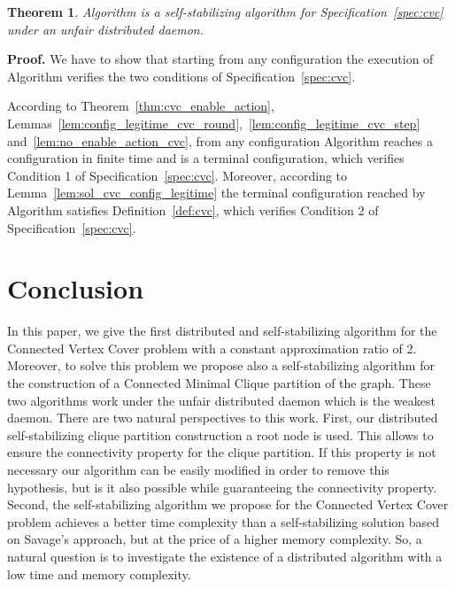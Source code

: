 \documentclass[11pt,letterpaper,onecolumn]{article}
\newtheorem{theorem}{Theorem}
\newenvironment{proof}{\noindent \begin{rm}{\textbf{Proof.} }}{\hspace*{\fill}\par\end{rm} \vspace{.3cm}}
\begin{document}
\begin{theorem}
Algorithm  is a self-stabilizing algorithm for Specification~\ref{spec:cvc} under an unfair distributed daemon.
\end{theorem}

\begin{proof}
We have to show that starting from any configuration the execution of Algorithm  verifies the two conditions of Specification~\ref{spec:cvc}.

According to Theorem~\ref{thm:cvc_enable_action}, Lemmas~\ref{lem:config_legitime_cvc_round},~\ref{lem:config_legitime_cvc_step} and~\ref{lem:no_enable_action_cvc}, from any configuration Algorithm  reaches a configuration  in finite time and  is a terminal configuration, which verifies Condition 1 of Specification~\ref{spec:cvc}. Moreover, according to Lemma~\ref{lem:sol_cvc_config_legitime} the terminal configuration  reached by Algorithm  satisfies Definition~\ref{def:cvc}, which verifies Condition 2 of Specification~\ref{spec:cvc}.
\end{proof}

\section{Conclusion}
In this paper, we give the first distributed and self-stabilizing algorithm for the Connected Vertex Cover problem with a constant approximation ratio of 2. Moreover, to solve this problem we propose also a self-stabilizing algorithm for the construction of a Connected Minimal Clique partition of the graph. These two algorithms work under the unfair distributed daemon which is the weakest daemon.
There are two natural perspectives to this work. First, our distributed self-stabilizing clique partition construction a root node is used. This allows to ensure the connectivity property for the clique partition. If this property is not necessary our algorithm can be easily modified in order to remove this hypothesis, but is it also possible while guaranteeing the connectivity property. Second, the self-stabilizing algorithm we propose for the Connected Vertex Cover problem achieves a better time complexity than a self-stabilizing solution based on Savage's approach, but at the price of a higher memory complexity. So, a natural question is to investigate the existence of a distributed algorithm with a low time and memory complexity.






\end{document}
